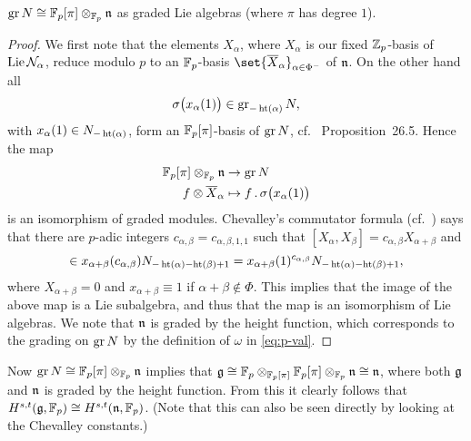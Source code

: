 \begin{lemma}
  $\operatorname{gr} N \cong \mathbb{F}_{p}[\pi] \otimes_{\mathbb{F}_{p}} \mathfrak{n}$ as graded Lie algebras (where $\pi$ has degree $1$).
\end{lemma}
\begin{proof}
  We first note that the elements $X_{\alpha}$, where $X_{\alpha}$ is our fixed $\mathbb{Z}_{p}$-basis of $\operatorname{Lie} \mathcal{N}_{\alpha}$, reduce modulo $p$ to an $\mathbb{F}_{p}$-basis $\set{\overline{X}_{\alpha}}_{\alpha \in \Phi^{-}}$ of $\mathfrak{n}$. On the other hand all
  \begin{equation*}
    \sigma\bigl(x_{\alpha}(1)\bigr) \in \operatorname{gr}_{-\operatorname{ht}(\alpha)} N,
  \end{equation*}
  with $x_{\alpha}(1) \in N_{-\operatorname{ht}(\alpha)}$, form an $\mathbb{F}_{p}[\pi]$-basis of $\operatorname{gr} N$, cf.\ \cite{Sch} Proposition~26.5. Hence the map
  \begin{align*}
    \mathbb{F}_{p}[\pi] \otimes_{\mathbb{F}_{p}} \mathfrak{n} &\to \operatorname{gr} N \\
    f \otimes \overline{X}_{\alpha} &\mapsto f \,.\, \sigma\bigl(x_{\alpha}(1)\bigr)
  \end{align*}
  is an isomorphism of graded modules. Chevalley's commutator formula (cf.\ \cite[Prop.~5.1.14]{Con-book}) says that there are $p$-adic integers $c_{\alpha,\beta} = c_{\alpha,\beta,1,1}$ such that $[X_{\alpha},X_{\beta}] = c_{\alpha,\beta}X_{\alpha+\beta}$ and
  \begin{equation*}
    [x_{\alpha}(1),x_{\beta}(1)] \in x_{\alpha+\beta}(c_{\alpha,\beta})N_{-\Ht(\alpha)-\Ht(\beta)+1} = x_{\alpha+\beta}(1)^{c_{\alpha,\beta}}N_{-\Ht(\alpha)-\Ht(\beta)+1},
  \end{equation*}
  where $X_{\alpha+\beta} = 0$ and $x_{\alpha+\beta} \equiv 1$ if $\alpha+\beta \notin \Phi$. This implies that the image of the above map is a Lie subalgebra, and thus that the map is an isomorphism of Lie algebras. We note that $\mathfrak{n}$ is graded by the height function, which corresponds to the grading on $\operatorname{gr} N$ by the definition of $\omega$ in \eqref{eq:p-val}.
\end{proof}

Now $\operatorname{gr} N \cong \mathbb{F}_p[\pi] \otimes_{\mathbb{F}_p} \mathfrak{n}$ implies that $\mathfrak{g} \cong \mathbb{F}_p \otimes_{\mathbb{F}_p[\pi]} \mathbb{F}_p[\pi] \otimes_{\mathbb{F}_p} \mathfrak{n} \cong \mathfrak{n}$, where both $\mathfrak{g}$ and $\mathfrak{n}$ is graded by the height function. From this it clearly follows that $H^{s,t}(\mathfrak{g},\mathbb{F}_{p}) \cong H^{s,t}(\mathfrak{n},\mathbb{F}_{p})$. (Note that this can also be seen directly by looking at the Chevalley constants.)

